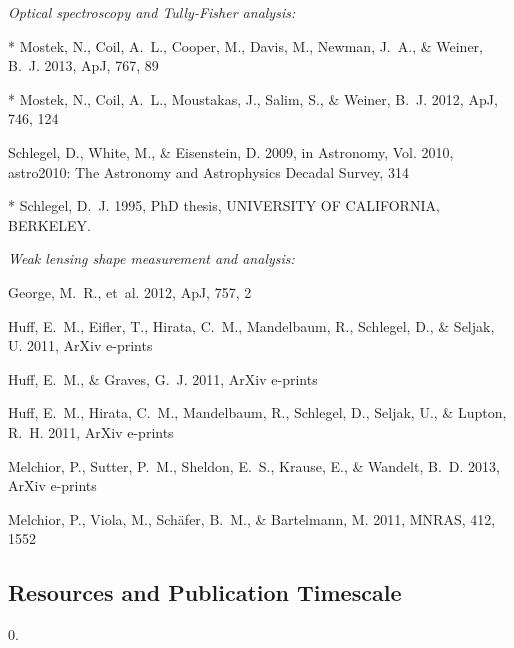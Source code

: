\documentclass[12pt]{article}
\begin{document}
\begin{description}
\item \textit{Optical spectroscopy and Tully-Fisher analysis:}
  \begin{description}
  \item {}, N., {Coil}, A.~L., {Cooper}, M., {Davis}, M., {Newman}, J.~A., \&
    {Weiner}, B.~J. 2013, ApJ, 767, 89
  \item {}, N., {Coil}, A.~L., {Moustakas}, J., {Salim}, S., \& {Weiner}, B.~J.
    2012, ApJ, 746, 124
  \item {Schlegel}, D., {White}, M., \& {Eisenstein}, D. 2009, in Astronomy, Vol. 2010,
    astro2010: The Astronomy and Astrophysics Decadal Survey, 314
  \item {}, D.~J. 1995, PhD thesis, UNIVERSITY OF CALIFORNIA, BERKELEY.
  \end{description}
\item \textit{Weak lensing shape measurement and analysis:}
  \begin{description}
  \item {George}, M.~R., {et~al.} 2012, ApJ, 757, 2
  \item {Huff}, E.~M., {Eifler}, T., {Hirata}, C.~M., {Mandelbaum}, R., {Schlegel}, D.,
    \& {Seljak}, U. 2011{}, ArXiv e-prints
  \item {Huff}, E.~M., \& {Graves}, G.~J. 2011, ArXiv e-prints
  \item {Huff}, E.~M., {Hirata}, C.~M., {Mandelbaum}, R., {Schlegel}, D., {Seljak}, U.,
    \& {Lupton}, R.~H. 2011{}, ArXiv e-prints
  \item {Melchior}, P., {Sutter}, P.~M., {Sheldon}, E.~S., {Krause}, E., \& {Wandelt},
    B.~D. 2013, ArXiv e-prints
  \item {Melchior}, P., {Viola}, M., {Sch{\"a}fer}, B.~M., \& {Bartelmann}, M. 2011,
    MNRAS, 412, 1552
  \end{description}
\end{description}

\subsection{Resources and Publication Timescale}

\renewcommand{\bibfont}{\footnotesize}
\begin{spacing}{0.}


\end{spacing}
\end{document}

